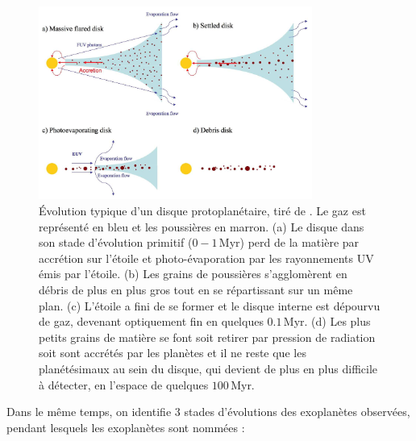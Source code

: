 \begin{figure}[ht!]
    \centering
    \includegraphics[width=0.8\textwidth]{Figure_Chap1/Williams2011_Fig06_PlanetaryDiskEvolution.png}
    \caption[Évolution typique d'un disque protoplanétaire.]{Évolution typique d'un disque protoplanétaire, tiré de \cite{williams2011}. Le gaz est représenté en bleu et les poussières en marron. (a) Le disque dans son stade d'évolution primitif ($0-1\,$Myr) perd de la matière par accrétion sur l'étoile et photo-évaporation par les rayonnements \ac{UV} émis par l'étoile. (b) Les grains de poussières s'agglomèrent en débris de plus en plus gros tout en se répartissant sur un même plan. (c) L'étoile a fini de se former et le disque interne est dépourvu de gaz, devenant optiquement fin en quelques $0.1 \,$Myr. (d) Les plus petits grains de matière se font soit retirer par pression de radiation soit sont accrétés par les planètes et il ne reste que les planétésimaux au sein du disque, qui devient de plus en plus difficile à détecter, en l'espace de quelques $100 \,$Myr.}
    \label{fig:DiskEvo}
\end{figure}

Dans le même temps, on identifie $3$ stades d'évolutions des exoplanètes observées, pendant lesquels les exoplanètes sont nommées :

